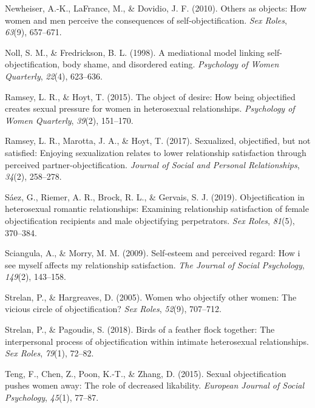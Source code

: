 \documentclass[
  man]{apa6}
\newlength{\cslhangindent}
\newlength{\cslentryspacingunit} %
\newenvironment{CSLReferences}[2] %
 {%
  \setlength{\parindent}{0pt}
  \ifodd #1
  \let\oldpar\par
  \def\par{\hangindent=\cslhangindent\oldpar}
  \fi
  \setlength{\parskip}{#2\cslentryspacingunit}
 }%
 {}
\begin{document}
\begin{CSLReferences}{1}{0}
\leavevmode{}%
Newheiser, A.-K., LaFrance, M., \& Dovidio, J. F. (2010). Others as objects: How women and men perceive the consequences of self-objectification. \emph{Sex Roles}, \emph{63}(9), 657--671.

\leavevmode{}%
Noll, S. M., \& Fredrickson, B. L. (1998). A mediational model linking self-objectification, body shame, and disordered eating. \emph{Psychology of Women Quarterly}, \emph{22}(4), 623--636.

\leavevmode{}%
Ramsey, L. R., \& Hoyt, T. (2015). The object of desire: How being objectified creates sexual pressure for women in heterosexual relationships. \emph{Psychology of Women Quarterly}, \emph{39}(2), 151--170.

\leavevmode{}%
Ramsey, L. R., Marotta, J. A., \& Hoyt, T. (2017). Sexualized, objectified, but not satisfied: Enjoying sexualization relates to lower relationship satisfaction through perceived partner-objectification. \emph{Journal of Social and Personal Relationships}, \emph{34}(2), 258--278.

\leavevmode{}%
Sáez, G., Riemer, A. R., Brock, R. L., \& Gervais, S. J. (2019). Objectification in heterosexual romantic relationships: Examining relationship satisfaction of female objectification recipients and male objectifying perpetrators. \emph{Sex Roles}, \emph{81}(5), 370--384.

\leavevmode{}%
Sciangula, A., \& Morry, M. M. (2009). Self-esteem and perceived regard: How i see myself affects my relationship satisfaction. \emph{The Journal of Social Psychology}, \emph{149}(2), 143--158.

\leavevmode{}%
Strelan, P., \& Hargreaves, D. (2005). Women who objectify other women: The vicious circle of objectification? \emph{Sex Roles}, \emph{52}(9), 707--712.

\leavevmode{}%
Strelan, P., \& Pagoudis, S. (2018). Birds of a feather flock together: The interpersonal process of objectification within intimate heterosexual relationships. \emph{Sex Roles}, \emph{79}(1), 72--82.

\leavevmode{}%
Teng, F., Chen, Z., Poon, K.-T., \& Zhang, D. (2015). Sexual objectification pushes women away: The role of decreased likability. \emph{European Journal of Social Psychology}, \emph{45}(1), 77--87.


\end{CSLReferences}
\end{document}
